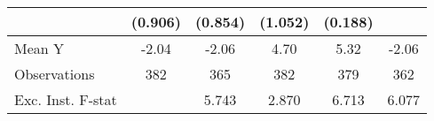 {\begin{tabular}{l*{5}{c}}
            &     (0.906)         &     (0.854)         &     (1.052)         &     (0.188)         &                     \\
\midrule
Mean Y      &       -2.04         &       -2.06         &        4.70         &        5.32         &       -2.06         \\
Observations&         382         &         365         &         382         &         379         &         362         \\
Exc. Inst. F-stat&                     &       5.743         &       2.870         &       6.713         &       6.077         \\
\bottomrule
\end{tabular}
}
